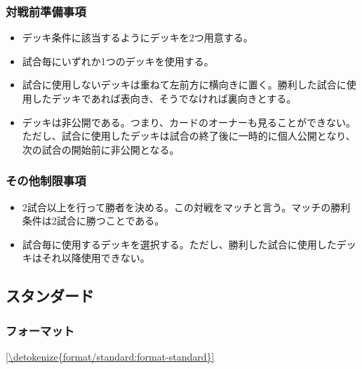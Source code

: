 \documentclass[letterpaper,10pt,dvipdfmx]{sphinxmanual}
\begin{document}
\subsubsection{対戦前準備事項}
\label{\detokenize{match-regulations/lite_randomhalf:id4}}\begin{itemize}
\item {} 
\sphinxAtStartPar
デッキ条件に該当するようにデッキを2つ用意する。

\item {} 
\sphinxAtStartPar
試合毎にいずれか1つのデッキを使用する。

\item {} 
\sphinxAtStartPar
試合に使用しないデッキは重ねて左前方に横向きに置く。勝利した試合に使用したデッキであれば表向き、そうでなければ裏向きとする。

\item {} 
\sphinxAtStartPar
デッキは非公開である。つまり、カードのオーナーも見ることができない。ただし、試合に使用したデッキは試合の終了後に一時的に個人公開となり、次の試合の開始前に非公開となる。

\end{itemize}


\subsubsection{その他制限事項}
\label{\detokenize{match-regulations/lite_randomhalf:id5}}\begin{itemize}
\item {} 
\sphinxAtStartPar
2試合以上を行って勝者を決める。この対戦をマッチと言う。マッチの勝利条件は2試合に勝つことである。

\item {} 
\sphinxAtStartPar
試合毎に使用するデッキを選択する。ただし、勝利した試合に使用したデッキはそれ以降使用できない。

\end{itemize}

\sphinxstepscope


\subsection{スタンダード}
\label{\detokenize{match-regulations/standard:id1}}\label{\detokenize{match-regulations/standard::doc}}

\subsubsection{フォーマット}
\label{\detokenize{match-regulations/standard:id2}}
\sphinxAtStartPar
\hyperref[\detokenize{format/standard:format-standard}]{\ref{\detokenize{format/standard:format-standard}} }
\end{document}
